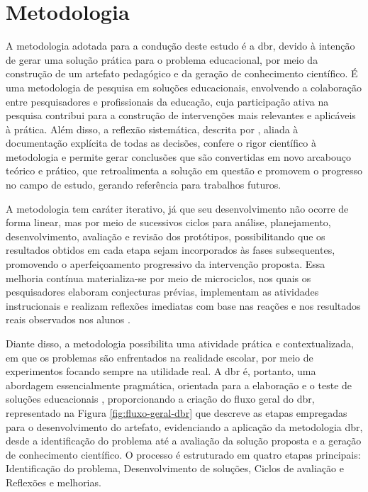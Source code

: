 
\chapter{Metodologia}
\label{ch:metodologia}
A metodologia adotada para a condução deste estudo é a \gls{dbr}, devido à
intenção de gerar uma solução prática para o problema educacional, por meio da
construção de um artefato pedagógico e da geração de conhecimento científico. É
uma metodologia de pesquisa em soluções educacionais, envolvendo a colaboração
entre pesquisadores e profissionais da educação, cuja participação ativa na
pesquisa contribui para a construção de intervenções mais relevantes e
aplicáveis à prática. Além disso, a reflexão sistemática, descrita por
, aliada à documentação explícita de todas as
decisões, confere o rigor científico à metodologia e permite gerar conclusões
que são convertidas em novo arcabouço teórico e prático, que retroalimenta a
solução em questão e promovem o progresso no campo de estudo, gerando referência
para trabalhos futuros.

A metodologia tem caráter iterativo, já que seu desenvolvimento não ocorre de
forma linear, mas por meio de sucessivos ciclos para análise, planejamento,
desenvolvimento, avaliação e revisão dos protótipos, possibilitando que os
resultados obtidos em cada etapa sejam incorporados às fases subsequentes,
promovendo o aperfeiçoamento progressivo da intervenção proposta. Essa melhoria
contínua materializa-se por meio de microciclos, nos quais os pesquisadores
elaboram conjecturas prévias, implementam as atividades instrucionais e realizam
reflexões imediatas com base nas reações e nos resultados reais observados nos
alunos \cite{obrien2018practical}. 

Diante disso, a metodologia possibilita uma atividade prática e contextualizada, em que
os problemas são enfrentados na realidade escolar, por meio de
experimentos focando sempre na utilidade real. A \gls{dbr} é, portanto,
uma abordagem essencialmente pragmática, orientada para a elaboração e o teste
de soluções educacionais \cite{obrien2018practical}, proporcionando 
a criação do fluxo geral do \gls{dbr}, representado na Figura \ref{fig:fluxo-geral-dbr} que descreve as etapas empregadas para o
desenvolvimento do artefato, evidenciando a aplicação da metodologia \gls{dbr}, desde
a identificação do problema até a avaliação da solução proposta e a geração de
conhecimento científico. O processo é estruturado em quatro etapas principais:
Identificação do problema, Desenvolvimento de soluções, Ciclos de avaliação e
Reflexões e melhorias.

